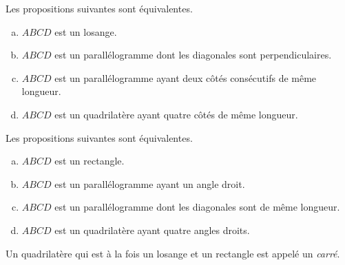 \documentclass[twocolumn,12pt]{article}
\begin{document}
\begin{propriete}[Losange]
  Les propositions suivantes sont équivalentes.
  \begin{enumerate}[(a)]
    \item $ABCD$ est un losange.
    \item $ABCD$ est un parallélogramme dont les diagonales sont perpendiculaires.
    \item $ABCD$ est un parallélogramme ayant deux côtés consécutifs de même longueur.
    \item $ABCD$ est un quadrilatère ayant quatre côtés de même longueur.
  \end{enumerate}
\end{propriete}

\begin{propriete}[Rectangle]
  Les propositions suivantes sont équivalentes.
  \begin{enumerate}[(a)]
    \item $ABCD$ est un rectangle.
    \item $ABCD$ est un parallélogramme ayant un angle droit.
    \item $ABCD$ est un parallélogramme dont les diagonales sont de même longueur.
    \item $ABCD$ est un quadrilatère ayant quatre angles droits.
  \end{enumerate}
\end{propriete}

\begin{definition}[Carré]
  Un quadrilatère qui est à la fois un losange et un rectangle est appelé un \emph{carré}.
\end{definition}
\end{document}
